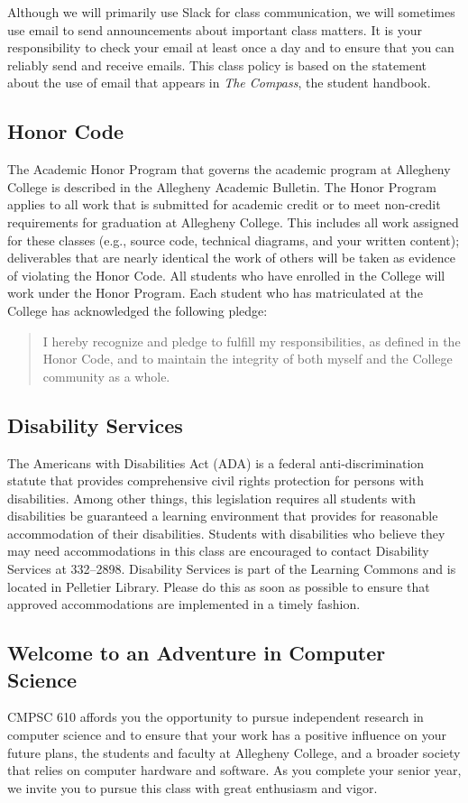 \documentclass[11pt]{article}
\begin{document}
Although we will primarily use Slack for class communication, we will sometimes
use email to send announcements about important class matters. It is your
responsibility to check your email at least once a day and to ensure that you
can reliably send and receive emails. This class policy is based on the
statement about the use of email that appears in {\em The Compass}, the student
handbook.

\subsection*{Honor Code}

The Academic Honor Program that governs the academic program at Allegheny
College is described in the Allegheny Academic Bulletin. The Honor Program
applies to all work that is submitted for academic credit or to meet non-credit
requirements for graduation at Allegheny College. This includes all work
assigned for these classes (e.g., source code, technical diagrams, and your
written content); deliverables that are nearly identical the work of others will
be taken as evidence of violating the Honor Code. All students who have enrolled
in the College will work under the Honor Program. Each student who has
matriculated at the College has acknowledged the following pledge:

\begin{quote}
I hereby recognize and pledge to fulfill my responsibilities, as defined in the
Honor Code, and to maintain the integrity of both myself and the College
community as a whole.
\end{quote}

\subsection*{Disability Services}

The Americans with Disabilities Act (ADA) is a federal anti-discrimination
statute that provides comprehensive civil rights protection for persons with
disabilities. Among other things, this legislation requires all students with
disabilities be guaranteed a learning environment that provides for reasonable
accommodation of their disabilities. Students with disabilities who believe they
may need accommodations in this class are encouraged to contact Disability
Services at 332--2898. Disability Services is part of the Learning Commons and
is located in Pelletier Library. Please do this as soon as possible to ensure
that approved accommodations are implemented in a timely fashion.

\subsection*{Welcome to an Adventure in Computer Science}

CMPSC 610 affords you the opportunity to pursue independent research in
computer science and to ensure that your work has a positive influence on your
future plans, the students and faculty at Allegheny College, and a broader
society that relies on computer hardware and software. As you complete your
senior year, we invite you to pursue this class with great enthusiasm and
vigor.
\end{document}
